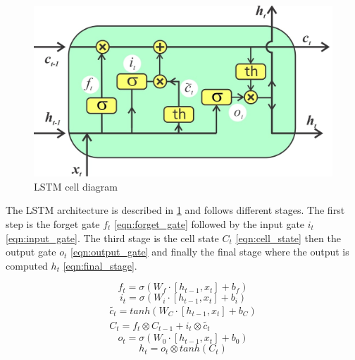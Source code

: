 \documentclass[anon]{CI}
\begin{document}
\begin{figure}[!ht]
    \center
    \includegraphics[width=\linewidth]{lstm-cell.jpg}
    \caption{\label{fig:LSTM-cell}LSTM cell diagram}
\end{figure}

The LSTM architecture is described in \ref{fig:LSTM-cell}\cite{LSTM} and follows different stages. The first step is the forget gate $f_t$ \ref{eqn:forget_gate} followed by the input gate $i_t$ \ref{eqn:input_gate}. The third stage is the cell state $C_t$ \ref{eqn:cell_state} then the output gate $o_t$ \ref{eqn:output_gate} and finally the final stage where the output is computed $h_t$ \ref{eqn:final_stage}.

\begin{equation}
    \label{eqn:forget_gate}
    f_t = \sigma(W_f \cdot [h_{t-1}, x_t] + b_f)
\end{equation}
\begin{equation}
    \label{eqn:input_gate}
    i_t = \sigma(W_i \cdot [h_{t-1}, x_t] + b_i)
\end{equation}
\begin{equation}
    \begin{split}
    \label{eqn:cell_state}
    \tilde{c_t} = tanh(W_C \cdot [h_{t-1}, x_t] + b_C) \\
    C_t = f_t \otimes C_{t-1} + i_t \otimes \tilde{c_t}
    \end{split}
\end{equation}
\begin{equation}
    \label{eqn:output_gate}
    o_t = \sigma(W_0 \cdot [h_{t-1}, x_t] + b_0)
\end{equation}
\begin{equation}
    \label{eqn:final_stage}
    h_t = o_t \otimes tanh(C_t)
\end{equation}
\end{document}
